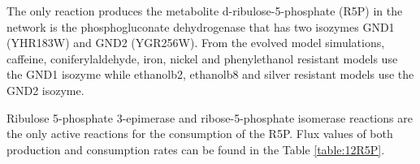 The only reaction produces the metabolite d-ribulose-5-phosphate (R5P) in the network is the phosphogluconate dehydrogenase that has two isozymes GND1 (YHR183W) and GND2 (YGR256W). From the evolved model simulations, caffeine, coniferylaldehyde, iron, nickel and phenylethanol resistant models use the GND1 isozyme while ethanolb2, ethanolb8 and silver resistant models use the GND2 isozyme.

Ribulose 5-phosphate 3-epimerase and ribose-5-phosphate isomerase reactions are the only active reactions for the consumption of the R5P. Flux values of both production and consumption rates can be found in the Table \ref{table:12R5P}.

\begin{table}[H]
\vspace{0.5cm}
\caption[Producing and consuming reaction fluxes for the metabolite d-ribulose-5-phosphate (R5P).]{Producing and consuming reaction fluxes for the metabolite d-ribulose-5-phosphate (R5P).}
\setlength{\tabcolsep}{4pt}
\end{table}
